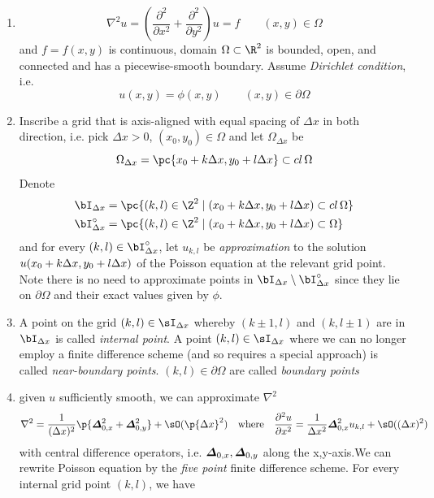 \documentclass[11pt]{article}
\begin{document}
\begin{enumerate}
    \item {} 
    \[
        \nabla^2 u = ( \frac{\partial^2}{\partial x^2} + \frac{\partial^2}{\partial y^2}) u = f \quad \quad (x,y)\in\Omega
    \]
    and $f=f(x,y)$ is continuous, domain $\Omega\subset \R^2$ is bounded, open, and connected and has a piecewise-smooth boundary. Assume \textit{Dirichlet condition}, i.e. 
    \[
        u(x,y) = \phi(x,y) \quad \quad (x,y)\in \partial \Omega    
    \]
    \item {} Inscribe a grid that is axis-aligned with equal spacing of $\Delta x$ in both direction, i.e. pick $\Delta x>0$, $(x_0, y_0) \in \Omega$ and let $\Omega_{\Delta x}$ be 
    \[
        \Omega_{\Delta x} = \pc{
            x_0 + k\Delta x, y_0 + l \Delta x
        } \subset \closure{\Omega}
    \]
    Denote 
    \begin{align*}
        \bI_{\Dx} &= \pc{
            (k,l)\in\Z^2 \mid (x_0 + k\Dx, y_0 + l\Dx) \subset \closure{\Omega}
        } \\
        \bI_{\Dx}^{\circ} &= \pc{
            (k,l)\in\Z^2 \mid (x_0 + k\Dx, y_0 + l\Dx) \subset \Omega
        }
    \end{align*}
    and for every $(k,l) \in \bI_{\Dx}^{\circ}$, let $u_{k,l}$ be \textit{approximation} to the solution $u(x_0 + k\Delta x, y_0 + l\Delta x)$ of the Poisson equation at the relevant grid point. Note there is no need to approximate points in $\bI_{\Dx} \setminus \bI_{\Dx}^{\circ}$ since they lie on $\partial \Omega$ and their exact values given by $\phi$.
    \item {} A point on the grid $(k,l) \in \sI_{\Dx}$ whereby $(k\pm 1,l)$ and $(k, l\pm 1)$ are in $\bI_{\Dx}$ is called \textit{internal point}. A point $(k,l) \in \sI_{\Dx}$ where we can no longer employ a finite difference scheme (and so requires a special approach) is called \textit{near-boundary points}. $(k,l) \in \partial \Omega$ are called \textit{boundary points}
    \item {} given $u$ sufficiently smooth, we can approximate $\nabla^2$
    \[
        \nabla^2 = \frac{1}{(\Dx)^2} \p{\vD_{0,x}^2 + \vD_{0,y}^2} + \sO(\p{\Dx}^2)
        \quad \text{where} \quad
        \frac{\partial^2 u}{\partial x^2} = \frac{1}{\Dx^2} \vD_{0,x}^2 u_{k,l} + \sO((\Dx)^2)
    \]
    with central difference operators, i.e. $\boldsymbol{\varDelta}_{0,x}, \boldsymbol{\varDelta}_{0,y}$ along the x,y-axis.We can rewrite Poisson equation by the \textit{five point} finite difference scheme. For every internal grid point $(k,l)$, we have 

\end{enumerate}
\end{document}
